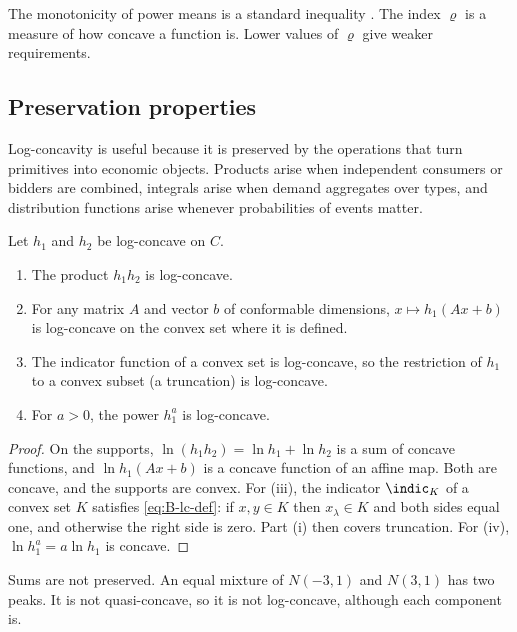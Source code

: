 The monotonicity of power means is a standard inequality \citep[Chapter~II]{HardyLittlewoodPolya1952}. The index
$\varrho$ is a measure of how concave a function is. Lower values of $\varrho$ give weaker requirements.

\subsection{Preservation properties}\label{sec:B-lc-properties}

Log-concavity is useful because it is preserved by the operations that turn primitives into economic
objects. Products arise when independent consumers or bidders are combined, integrals arise when demand
aggregates over types, and distribution functions arise whenever probabilities of events matter.

\begin{proposition}\label{prop:B-lc-products}
Let $h_1$ and $h_2$ be log-concave on $C$.
\begin{enumerate}[label=(\roman*)]
  \item The product $h_1h_2$ is log-concave.
  \item For any matrix $A$ and vector $b$ of conformable dimensions, $x \mapsto h_1(Ax + b)$ is log-concave on the
  convex set where it is defined.
  \item The indicator function of a convex set is log-concave, so the restriction of $h_1$ to a convex subset
  (a truncation) is log-concave.
  \item For $a > 0$, the power $h_1^a$ is log-concave.
\end{enumerate}
\end{proposition}

\begin{proof}
On the supports, $\ln(h_1h_2) = \ln h_1 + \ln h_2$ is a sum of concave functions, and $\ln h_1(Ax + b)$ is a
concave function of an affine map. Both are concave, and the supports are convex. For (iii), the indicator
$\indic_K$ of a convex set $K$ satisfies \eqref{eq:B-lc-def}: if $x, y \in K$ then $x_\lambda \in K$ and both sides
equal one, and otherwise the right side is zero. Part (i) then covers truncation. For (iv),
$\ln h_1^a = a\ln h_1$ is concave.
\end{proof}

Sums are not preserved. An equal mixture of $N(-3, 1)$ and $N(3, 1)$ has two peaks. It is not quasi-concave,
so it is not log-concave, although each component is.

